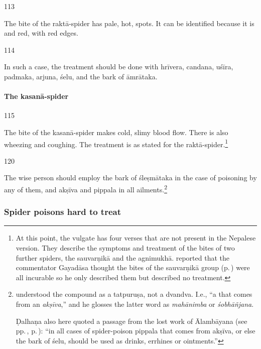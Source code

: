 \begin{translation}
\item[113]

The bite of the \Gls{raktā-spider} has pale, hot, 
spots.  It can be identified because it is  and red, with red edges.

\item[114]

In such a case, the treatment should be done with 
\gls{hrīvera},
\gls{candana},
\gls{uśīra},
\gls{padmaka},
\gls{arjuna},
\gls{śelu}, and the
bark of 
\gls{āmrātaka}.


\paragraph{The \Gls{kasanā-spider}}

\item[115]

The bite of the \Gls{kasanā-spider} makes cold, slimy blood flow.
There is also wheezing and coughing. The treatment is as stated for
the \Gls{raktā-spider}.\footnote{At this point, the vulgate has four
    verses that are not present in the Nepalese version.  They describe
    the symptoms and treatment of the bites of two further spiders, the
    \Gls{sauvarṇikā} and the \Gls{agnimukhā}.  
    reported that the commentator Gayadāsa thought the bites of the
    \Gls{sauvarṇikā} group (p.\,\pageref{sauvarnika-group}) were all incurable 
    so he only described them but described no treatment.}


 \item[120]
 
 The wise person should employ the bark of \gls{śleṣmātaka} in the case of 
 poisoning by any of them, and \gls{akṣīva} and \gls{pippala} in all 
 ailments.\footnote{ understood the compound  
  as a tatpuruṣa, not a dvandva. I.e., “a  
     that comes from an \emph{akṣīva},” and he glosses the latter word as 
     \emph{mahānimba} or \emph{śobhāñjana}.
     
     Ḍalhaṇa also here quoted a passage from the lost work of
Ālambāyana (see pp.\,\pageref{alambayana1},
p.\,\pageref{alambayana2}):  “in all cases of spider-poison \gls{pippala}
that comes from \gls{akṣīva}, or else the bark of \gls{śelu},
should be used as drinks, errhines or ointments.”}

\subsubsection{Spider poisons hard to treat}
  

\end{translation}
